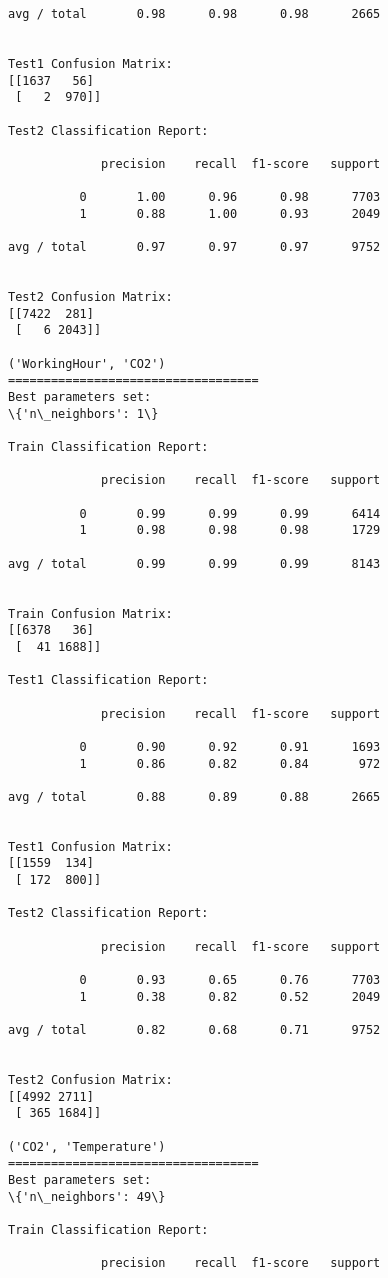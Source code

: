 \documentclass[11pt]{article}
\begin{document}
\begin{Verbatim}[commandchars=\\\{\}]
avg / total       0.98      0.98      0.98      2665


Test1 Confusion Matrix:
[[1637   56]
 [   2  970]]

Test2 Classification Report:

             precision    recall  f1-score   support

          0       1.00      0.96      0.98      7703
          1       0.88      1.00      0.93      2049

avg / total       0.97      0.97      0.97      9752


Test2 Confusion Matrix:
[[7422  281]
 [   6 2043]]

('WorkingHour', 'CO2')
===================================
Best parameters set:
\{'n\_neighbors': 1\}

Train Classification Report:

             precision    recall  f1-score   support

          0       0.99      0.99      0.99      6414
          1       0.98      0.98      0.98      1729

avg / total       0.99      0.99      0.99      8143


Train Confusion Matrix:
[[6378   36]
 [  41 1688]]

Test1 Classification Report:

             precision    recall  f1-score   support

          0       0.90      0.92      0.91      1693
          1       0.86      0.82      0.84       972

avg / total       0.88      0.89      0.88      2665


Test1 Confusion Matrix:
[[1559  134]
 [ 172  800]]

Test2 Classification Report:

             precision    recall  f1-score   support

          0       0.93      0.65      0.76      7703
          1       0.38      0.82      0.52      2049

avg / total       0.82      0.68      0.71      9752


Test2 Confusion Matrix:
[[4992 2711]
 [ 365 1684]]

('CO2', 'Temperature')
===================================
Best parameters set:
\{'n\_neighbors': 49\}

Train Classification Report:

             precision    recall  f1-score   support


\end{Verbatim}
\end{document}

